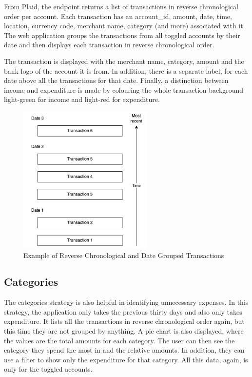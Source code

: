 From Plaid, the endpoint returns a list of transactions in reverse chronological order per account. Each transaction has an account\_id, amount, date, time, location, currency code, merchant name, category (and more) associated with it. The web application groups the transactions from all toggled accounts by their date and then displays each transaction in reverse chronological order.

The transaction is displayed with the merchant name, category, amount and the bank logo of the account it is from. In addition, there is a separate label, for each date above all the transactions for that date. Finally, a distinction between income and expenditure is made by colouring the whole transaction background light-green for income and light-red for expenditure.

\begin{figure}[H]
	\centering
	\includegraphics[width=0.6\textwidth]{images/transaction_labels.png}
	\caption{Example of Reverse Chronological and Date Grouped Transactions}
	\label{fig:TransactionLabels}
\end{figure}

\subsection{Categories}
The categories strategy is also helpful in identifying unnecessary expenses. In this strategy, the application only takes the previous thirty days and also only takes expenditure. It lists all the transactions in reverse chronological order again, but this time they are not grouped by anything. A pie chart is also displayed, where the values are the total amounts for each category. The user can then see the category they spend the most in and the relative amounts. In addition, they can use a filter to show only the expenditure for that category. All this data, again, is only for the toggled accounts.

